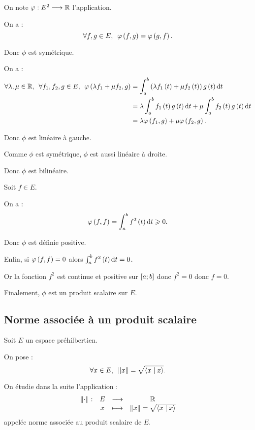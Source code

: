 \begin{dem}[2]
On note \(\varphi:E^2\longrightarrow\mathbb{R}\) l'application.

On a : \[\quantifs{\forall f,g\in E}\phi\paren{f,g}=\phi\paren{g,f}.\]

Donc \(\phi\) est symétrique.

On a : \[\begin{aligned}
\quantifs{\forall\lambda,\mu\in\R;\forall f_1,f_2,g\in E}\phi\paren{\lambda f_1+\mu f_2,g}&=\int_a^b\paren{\lambda f_1\paren{t}+\mu f_2\paren{t}}g\paren{t}\odif{t} \\
&=\lambda\int_a^bf_1\paren{t}g\paren{t}\odif{t}+\mu\int_a^bf_2\paren{t}g\paren{t}\odif{t} \\
&=\lambda\phi\paren{f_1,g}+\mu\phi\paren{f_2,g}.
\end{aligned}\]

Donc \(\phi\) est linéaire à gauche.

Comme \(\phi\) est symétrique, \(\phi\) est aussi linéaire à droite.

Donc \(\phi\) est bilinéaire.

Soit \(f\in E\).

On a : \[\phi\paren{f,f}=\int_a^bf^2\paren{t}\odif{t}\geq0.\]

Donc \(\phi\) est définie positive.

Enfin, si \(\varphi\left(f,f\right)=0\) alors \(\int_a^bf^2\paren{t}\odif{t}=0\).

Or la fonction \(f^2\) est continue et positive sur \(\left[a;b\right]\) donc \(f^2=0\) donc \(f=0\).

Finalement, \(\phi\) est un produit scalaire sur \(E\).
\end{dem}

\begin{dem}
\end{dem}

\subsection{Norme associée à un produit scalaire}

\begin{nota}
Soit \(E\) un espace préhilbertien.

On pose : \[\quantifs{\forall x\in E}\norme{x}=\sqrt{\ps{x}{x}}.\]

On étudie dans la suite l'application : \[\begin{array}[t]{cccc}\left\|\cdot\right\| : & E & \longrightarrow & \mathbb{R} \\ & x & \longmapsto & \left\|x\right\|=\sqrt{\left\langle x\;\middle|\; x\right\rangle}\end{array}\] appelée norme associée au produit scalaire de \(E\).
\end{nota}

